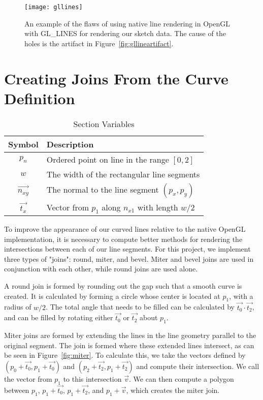 \begin{figure}
\label{fig:glexample}
\texttt{[image: gllines]}
\caption[Flaws in GL\_LINES]{An example of the flaws of using native line rendering in OpenGL with GL\_LINES for rendering our sketch data. The cause of the holes is the artifact in Figure~\ref{fig:gllineartifact}.}
\end{figure}

\section{Creating Joins From the Curve Definition}

\begin{table}
\begin{center}
\begin{tabular}{|c|l|}
\hline
\textbf{Symbol} & \textbf{Description} \\ \hline
$p_n$			& Ordered point on line in the range $[0,2]$ \\
$w$				& The width of the rectangular line segments \\
$\vec{n_{xy}}$		& The normal to the line segment $(p_x, p_y)$ \\	
$\vec{t_x}$			& Vector from $p_1$ along $n_{x1}$ with length $w/2$ \\
\hline
\end{tabular}
\caption{Section Variables} \label{tab:linevariables}
\end{center}
\end{table}

To improve the appearance of our curved lines relative to the native OpenGL implementation, it is necessary to compute better methods for rendering the intersections between each of our line segments.
For this project, we implement three types of "joins": round, miter, and bevel.
Miter and bevel joins are used in conjunction with each other, while round joins are used alone.

A round join is formed by rounding out the gap such that a smooth curve is created. 
It is calculated by forming a circle whose center is located at $p_1$, with a radius of $w/2$. 
The total angle that needs to be filled can be calculated by $\vec{t_0} \cdot \vec{t_2}$, and can be filled by rotating either $\vec{t_0}$ or $\vec{t_2}$ about $p_1$.

Miter joins are formed by extending the lines in the line geometry parallel to the original segment.
The join is formed where these extended lines intersect, as can be seen in Figure~\ref{fig:miter}.
To calculate this, we take the vectors defined by $(p_0 + \vec{t_0}, p_1 + \vec{t_0})$ and $(p_2 + \vec{t_2}, p_1 + \vec{t_2})$ and compute their intersection. We call the vector from $p_1$ to this intersection $\vec{v}$.
We can then compute a polygon between $p_1$, $p_1 + \vec{t_0}$, $p_1 + \vec{t_2}$, and $p_1 + \vec{v}$, which creates the miter join. 

